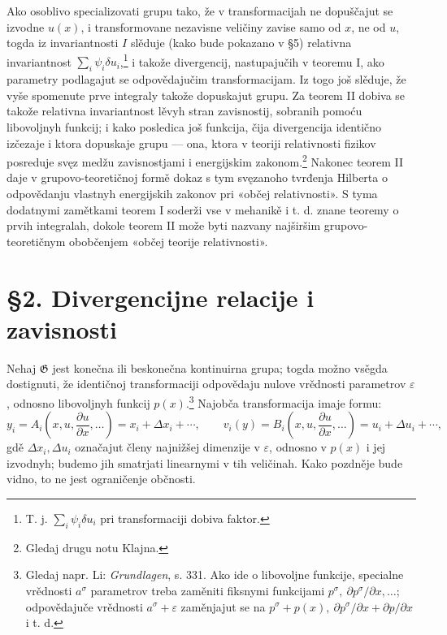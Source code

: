 \documentclass[11pt]{article}
\providecommand{\G}{\mathfrak G}
\providecommand{\eps}{\varepsilon}
\providecommand{\D}{\Delta}
\providecommand{\p}{\partial}
\begin{document}
Ako osoblivo specializovati grupu tako, že v transformacijah ne dopuščajut se izvodne \(u(x)\), i transformovane nezavisne veličiny zavise samo od \(x\), ne od \(u\), togda iz invariantnosti \(I\) slěduje (kako bude pokazano v \S{}5) relativna invariantnost \(\sum_i\psi_i\delta u_i\),\footnote{T. j. \(\sum_i\psi_i\delta u_i\) pri transformaciji dobiva faktor.} i takože divergencij, nastupajučih v teoremu I, ako parametry podlagajut se odpovědajučim transformacijam. Iz togo još slěduje, že vyše spomenute prve integraly takože dopuskajut grupu. Za teorem II dobiva se takože relativna invariantnost lěvyh stran zavisnostij, sobranih pomoću libovoljnyh funkcij; i kako posledica još funkcija, čija divergencija identično izčezaje i ktora dopuskaje grupu --- ona, ktora v teoriji relativnosti fizikov posreduje svęz medžu zavisnostjami i energijskim zakonom.\footnote{Gledaj drugu notu Klajna.} Nakonec teorem II daje v grupovo-teoretičnoj formě dokaz s tym svęzanoho tvrđenja Hilberta o odpovědanju vlastnyh energijskih zakonov pri «občej relativnosti». S tyma dodatnymi zamětkami teorem I soderži vse v mehanikě i t. d. znane teoremy o prvih integralah, dokole teorem II može byti nazvany najširšim grupovo-teoretičnym obobčenjem «občej teorije relativnosti».

\section*{\S{}2. Divergencijne relacije i zavisnosti}

Nehaj \(\G\) jest konečna ili beskonečna kontinuirna grupa; togda možno vsěgda dostignuti, že identičnoj transformaciji odpovědaju nulove vrědnosti parametrov \(\eps\), odnosno libovoljnyh funkcij \(p(x)\).\footnote{Gledaj napr. Li: \emph{Grundlagen}, s. 331. Ako ide o libovoljne funkcije, specialne vrědnosti \(a^\sigma\) parametrov treba zaměniti fiksnymi funkcijami \(p^\sigma,\ \p p^\sigma/\p x,\ldots\); odpovědajuče vrědnosti \(a^\sigma+\eps\) zaměnjajut se na \(p^\sigma+p(x),\ \p p^\sigma/\p x+\p p/\p x\) i t. d.} Najobča transformacija imaje formu:
\[
y_i=A_i\!\left(x,u,\frac{\p u}{\p x},\ldots\right)=x_i+\D x_i+\cdots,\qquad
v_i(y)=B_i\!\left(x,u,\frac{\p u}{\p x},\ldots\right)=u_i+\D u_i+\cdots,
\]
gdě \(\D x_i,\D u_i\) označajut členy najnižšej dimenzije v \(\eps\), odnosno v \(p(x)\) i jej izvodnyh; budemo jih smatrjati linearnymi v tih veličinah. Kako pozdněje bude vidno, to ne jest ograničenje občnosti.
\end{document}
